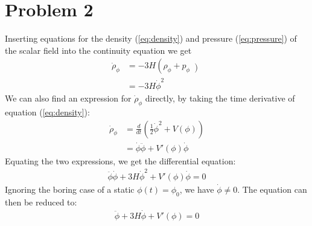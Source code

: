 \documentclass[reprint,english,notitlepage,nofootinbib]{revtex4-1}  %
\numberwithin{equation}{section}
\begin{document}
\section{Problem 2}
Inserting equations for the density (\ref{eq:density}) and pressure
(\ref{eq:pressure}) of the scalar field into the continuity equation we get
\begin{align}
	\dot{\rho}_\phi &= -3H\left(\rho_\phi + p_\phi \left) \\
									&= -3H\dot{\phi}^2
\end{align}
We can also find an expression for $\dot{\rho}_\phi$ directly, by taking the
time derivative of equation (\ref{eq:density}):
\begin{align}
	\dot{\rho}_\phi &= \frac{d}{dt}\left(\frac{1}{2} \dot{\phi}^2 + V(\phi) \right)\\
					  			&= \dot{\phi} \ddot{\phi} + {V}'(\phi) \dot{\phi}
\end{align}
Equating the two expressions, we get the differential equation:
\begin{align}
	\ddot{\phi}\dot{\phi}  + 3H\dot{\phi}^2 + {V}'(\phi) \dot{\phi} = 0
\end{align}
Ignoring the boring case of a static $\phi(t)=\phi_0$, we have $\dot{\phi} \neq0$.
The equation can then be reduced to:
\begin{align}
	\ddot{\phi} + 3H\dot{\phi} + {V}'(\phi) = 0 \label{eq:phi_ddot}
\end{align}
\end{document}

